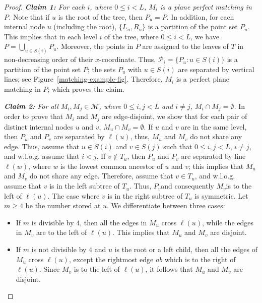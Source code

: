 \documentclass[11pt,a4paper]{article}
\begin{document}
\begin{proof}
\vspace{10pt}
{\em {\bf Claim 1:} For each $i$, where $0\le i< L$, $M_i$ is a plane perfect matching in $P$.} 
Note that if $u$ is the root of the tree, then $P_u=P$. In addition, for each internal node $u$ (including the root), $\{L_u,R_u\}$ is a partition of the point set $P_u$. This implies that in each level $i$ of the tree, where $0\le i <L$, we have $P=\bigcup_{u\in S(i)}{P_u}$. Moreover, the points in $P$ are assigned to the leaves of $T$ in non-decreasing order of their $x$-coordinate. Thus, $\mathcal{P}_i=\{P_u: u\in S(i)\}$ is a partition of the point set $P$; the sets $P_u$ with $u\in S(i)$ are separated by vertical lines; see Figure~\ref{matching-example-fig}. Therefore, $M_i$ is a perfect plane matching in $P$; which proves the claim.
\vspace{10pt}

\vspace{10pt}
{\em {\bf Claim 2:} For all $M_i, M_j\in \mathcal{M}$, where $0\le i,j<L$ and $i\neq j$, $M_i\cap M_j=\emptyset$.}
In order to prove that $M_i$ and $M_j$ are edge-disjoint, we show that for each pair of distinct internal nodes $u$ and $v$, $M_u\cap M_v=\emptyset$. If $u$ and $v$ are in the same level, then $P_u$ and $P_v$ are separated by $\ell(u)$, thus, $M_u$ and $M_v$ do not share any edge. Thus, assume that $u\in S(i)$ and $v\in S(j)$ such that $0\le i, j< L$, $i\neq j$, and w.l.o.g. assume that $i< j$. If $v\notin T_u$, then $P_u$ and $P_v$ are separated by line $\ell(w)$, where $w$ is the lowest common ancestor of $u$ and $v$; this implies that $M_u$ and $M_v$ do not share any edge. Therefore, assume that $v\in T_u$, and w.l.o.g. assume that $v$ is in the left subtree of $T_u$. Thus, $P_v$\textemdash and consequently $M_v$\textemdash is to the left of $\ell(u)$. The case where $v$ is in the right subtree of $T_u$ is symmetric. Let $m\ge 4$ be the number stored at $u$. We differentiate between three cases:

\begin{itemize}
  \item If $m$ is divisible by $4$, then all the edges in $M_u$ cross $\ell(u)$, while the edges in $M_v$ are to the left of $\ell(u)$. This implies that $M_u$ and $M_v$ are disjoint. 

  \item If $m$ is not divisible by $4$ and $u$ is the root or a left child, then all the edges of $M_u$ cross $\ell(u)$, except the rightmost edge $ab$ which is to the right of $\ell(u)$. Since $M_v$ is to the left of $\ell(u)$, it follows that $M_u$ and $M_v$ are disjoint. 


\end{itemize}
\end{proof}
\end{document}
